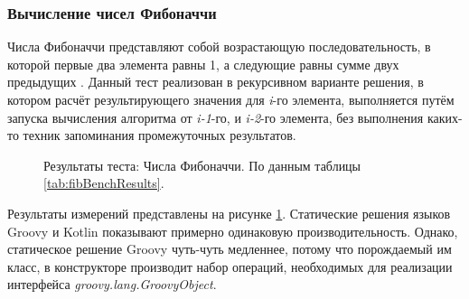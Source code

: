 \subsubsection{Вычисление чисел Фибоначчи}

Числа Фибоначчи представляют собой возрастающую последовательность, в которой первые два элемента равны 1, а следующие равны сумме двух предыдущих \cite{math:vilenkin1969Combinatorics}. Данный тест реализован в рекурсивном варианте решения, в котором расчёт результирующего значения для \textit{i}-го элемента, выполняется путём запуска вычисления алгоритма от \textit{i-1}-го, и \textit{i-2}-го элемента, без выполнения каких-то техник запоминания промежуточных результатов.


\begin{figure}
\caption{\label{graph:fibBenchResults}Результаты теста: Числа Фибоначчи. По данным таблицы \ref{tab:fibBenchResults}.}
\end{figure}


Результаты измерений представлены на рисунке \ref{graph:fibBenchResults}. Статические решения языков Groovy и Kotlin показывают примерно одинаковую производительность. Однако, статическое решение Groovy чуть-чуть медленнее, потому что порождаемый им класс, в конструкторе  производит набор операций, необходимых для реализации интерфейса \textit{groovy.lang.GroovyObject}.


